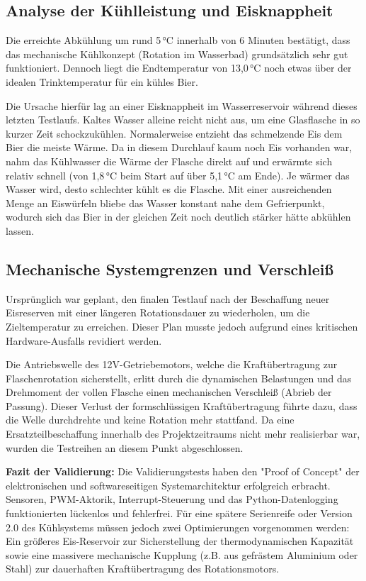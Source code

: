 \subsection{Analyse der Kühlleistung und Eisknappheit}
Die erreichte Abkühlung um rund 5\,°C innerhalb von 6 Minuten bestätigt, dass das mechanische Kühlkonzept (Rotation im Wasserbad) grundsätzlich sehr gut funktioniert. Dennoch liegt die Endtemperatur von 13,0\,°C noch etwas über der idealen Trinktemperatur für ein kühles Bier.

Die Ursache hierfür lag an einer Eisknappheit im Wasserreservoir während dieses letzten Testlaufs. Kaltes Wasser alleine reicht nicht aus, um eine Glasflasche in so kurzer Zeit schockzukühlen. Normalerweise entzieht das schmelzende Eis dem Bier die meiste Wärme. Da in diesem Durchlauf kaum noch Eis vorhanden war, nahm das Kühlwasser die Wärme der Flasche direkt auf und erwärmte sich relativ schnell (von 1,8\,°C beim Start auf über 5,1\,°C am Ende). Je wärmer das Wasser wird, desto schlechter kühlt es die Flasche. Mit einer ausreichenden Menge an Eiswürfeln bliebe das Wasser konstant nahe dem Gefrierpunkt, wodurch sich das Bier in der gleichen Zeit noch deutlich stärker hätte abkühlen lassen.

\subsection{Mechanische Systemgrenzen und Verschleiß}
Ursprünglich war geplant, den finalen Testlauf nach der Beschaffung neuer Eisreserven mit einer längeren Rotationsdauer zu wiederholen, um die Zieltemperatur zu erreichen. Dieser Plan musste jedoch aufgrund eines kritischen Hardware-Ausfalls revidiert werden. 

Die Antriebswelle des 12V-Getriebemotors, welche die Kraftübertragung zur Flaschenrotation sicherstellt, erlitt durch die dynamischen Belastungen und das Drehmoment der vollen Flasche einen mechanischen Verschleiß (Abrieb der Passung). Dieser Verlust der formschlüssigen Kraftübertragung führte dazu, dass die Welle durchdrehte und keine Rotation mehr stattfand. Da eine Ersatzteilbeschaffung innerhalb des Projektzeitraums nicht mehr realisierbar war, wurden die Testreihen an diesem Punkt abgeschlossen.

\textbf{Fazit der Validierung:}
Die Validierungstests haben den "Proof of Concept" der elektronischen und softwareseitigen Systemarchitektur erfolgreich erbracht. Sensoren, PWM-Aktorik, Interrupt-Steuerung und das Python-Datenlogging funktionierten lückenlos und fehlerfrei. Für eine spätere Serienreife oder Version 2.0 des Kühlsystems müssen jedoch zwei Optimierungen vorgenommen werden: Ein größeres Eis-Reservoir zur Sicherstellung der thermodynamischen Kapazität sowie eine massivere mechanische Kupplung (z.B. aus gefrästem Aluminium oder Stahl) zur dauerhaften Kraftübertragung des Rotationsmotors.